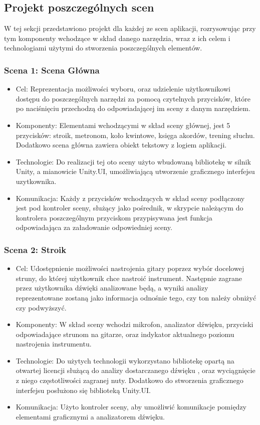 \subsection{Projekt poszczególnych scen}
W tej sekcji przedstawiono projekt dla każdej ze scen aplikacji, rozrysowując przy tym komponenty wchodzące w skład danego narzędzia, wraz z ich celem i technologiami użytymi do stworzenia poszczególnych elementów. 

\subsubsection{Scena 1: Scena Główna}

\begin{itemize}

\item Cel: Reprezentacja możliwości wyboru, oraz udzielenie użytkownikowi dostępu do poszczególnych narzędzi za pomocą czytelnych przycisków, które po naciśnięciu przechodzą do odpowiadającej im sceny z danym narzędziem. 
\item Komponenty: Elementami wchodzącymi w skład sceny głównej, jest 5 przycisków: stroik, metronom, koło kwintowe, księga akordów, trening słuchu. Dodatkowo scena główna zawiera obiekt tekstowy z logiem aplikacji.  
\item Technologie: Do realizacji tej oto sceny użyto wbudowaną bibliotekę w silnik Unity, a mianowicie Unity.UI, umożliwiającą utworzenie graficznego interfejsu uzytkownika. 
\item Komunikacja: Każdy z przycisków wchodzących w skład sceny podłączony jest pod kontroler sceny, służący jako pośrednik, w skrypcie należącym do kontrolera poszczególnym przyciskom przypisywana jest funkcja odpowiadająca za załadowanie odpowiedniej sceny. 
\end{itemize}

\subsubsection{Scena 2: Stroik}

\begin{itemize}
\item Cel: Udostępnienie możliwości nastrojenia gitary poprzez wybór docelowej struny, do której użytkownik chce nastroić instrument. Następnie zagrane przez użytkownika dźwięki analizowane będą, a wyniki analizy reprezentowane zostaną jako informacja odnośnie tego, czy ton należy obniżyć czy podwyższyć.
\item Komponenty: W skład sceny wchodzi mikrofon, analizator dźwięku, przyciski odpowiadające strunom na gitarze, oraz indykator aktualnego poziomu nastrojenia instrumentu.  
\item Technologie: Do użytych technologii wykorzystano bibliotekę opartą na otwartej licencji służącą do analizy dostarczanego dźwięku \cite{AudioPitchEstimator}, oraz wyciągnięcie z niego częstotliwości zagranej nuty. Dodatkowo do stworzenia graficznego interfejsu posłużono się biblioteką Unity.UI.   
\item Komunikacja: Użyto kontroler sceny, aby umożliwić komunikacje pomiędzy elementami graficznymi a analizatorem dźwięku. 
\end{itemize}


